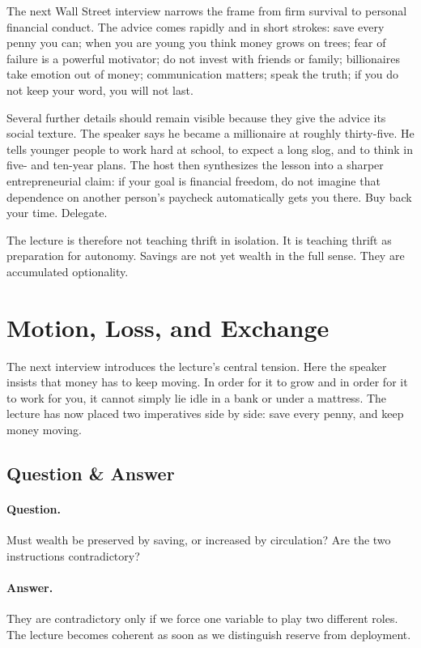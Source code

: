 The next Wall Street interview narrows the frame from firm survival to personal financial conduct. The advice comes rapidly and in short strokes: save every penny you can; when you are young you think money grows on trees; fear of failure is a powerful motivator; do not invest with friends or family; billionaires take emotion out of money; communication matters; speak the truth; if you do not keep your word, you will not last.

Several further details should remain visible because they give the advice its social texture. The speaker says he became a millionaire at roughly thirty-five. He tells younger people to work hard at school, to expect a long slog, and to think in five- and ten-year plans. The host then synthesizes the lesson into a sharper entrepreneurial claim: if your goal is financial freedom, do not imagine that dependence on another person's paycheck automatically gets you there. Buy back your time. Delegate.

The lecture is therefore not teaching thrift in isolation. It is teaching thrift as preparation for autonomy. Savings are not yet wealth in the full sense. They are accumulated optionality.

\section{Motion, Loss, and Exchange}

The next interview introduces the lecture's central tension. Here the speaker insists that money has to keep moving. In order for it to grow and in order for it to work for you, it cannot simply lie idle in a bank or under a mattress. The lecture has now placed two imperatives side by side: save every penny, and keep money moving.

\subsection{Question \& Answer}

\paragraph{Question.} Must wealth be preserved by saving, or increased by circulation? Are the two instructions contradictory?

\paragraph{Answer.} They are contradictory only if we force one variable to play two different roles. The lecture becomes coherent as soon as we distinguish reserve from deployment.

